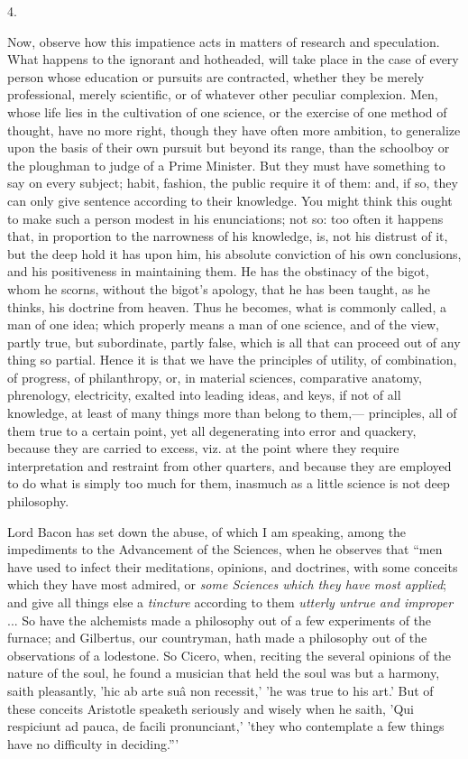 4.

Now, observe how this impatience acts in matters of research and
speculation. What happens to the ignorant and hotheaded, will take
place in the case of every person whose education or pursuits are
contracted, whether they be merely professional, merely scientific, or
of whatever other peculiar complexion. Men, whose life lies in the
cultivation of one science, or the exercise of one method of thought,
have no more right, though they have often more ambition, to
generalize upon the basis of their own pursuit but beyond its range,
than the schoolboy or the ploughman to judge of a Prime Minister. But
they must have something to say on every subject; habit, fashion, the
public require it of them: and, if so, they can only give sentence
according to their knowledge. You might think this ought to make such
a person modest in his enunciations; not so: too often it happens
that, in proportion to the narrowness of his knowledge, is, not his
distrust of it, but the deep hold it has upon him, his absolute
conviction of his own conclusions, and his positiveness in maintaining them. He has the obstinacy of the bigot, whom he scorns,
without the bigot's apology, that he has been taught, as he thinks,
his doctrine from heaven. Thus he becomes, what is commonly called, a
man of one idea; which properly means a man of one science, and of the
view, partly true, but subordinate, partly false, which is all that
can proceed out of any thing so partial. Hence it is that we have the
principles of utility, of combination, of progress, of philanthropy,
or, in material sciences, comparative anatomy, phrenology,
electricity, exalted into leading ideas, and keys, if not of all
knowledge, at least of many things more than belong to them,—
principles, all of them true to a certain point, yet all degenerating
into error and quackery, because they are carried to excess, viz. at
the point where they require interpretation and restraint from other
quarters, and because they are employed to do what is simply too much
for them, inasmuch as a little science is not deep philosophy.

Lord Bacon has set down the abuse, of which I am speaking, among
the impediments to the Advancement of the Sciences, when he observes
that ``men have used to infect their meditations, opinions, and
doctrines, with some conceits which they have most admired, or \emph{some
Sciences which they have most applied}; and give all things else a \emph{tincture}
according to them \emph{utterly untrue and improper} ... So have the
alchemists made a philosophy out of a few experiments of the furnace;
and Gilbertus, our countryman, hath made a philosophy out of the
observations of a lodestone. So Cicero, when, reciting the several
opinions of the nature of the soul, he found a musician that held the
soul was but a harmony, saith pleasantly, 'hic ab arte suâ non
recessit,' 'he was true to his art.' But of these conceits Aristotle
speaketh seriously and wisely when he saith, 'Qui respiciunt ad
pauca, de facili pronunciant,' 'they who contemplate a few things have
no difficulty in deciding.'''

